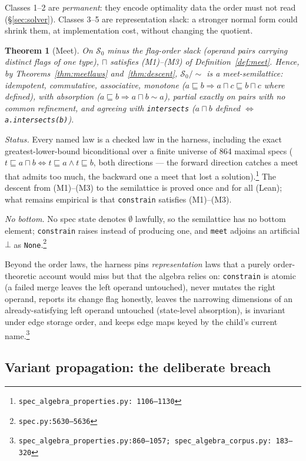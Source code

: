 \documentclass[11pt]{article}
\newtheorem{theorem}{Theorem}[section]
\theoremstyle{definition}
\theoremstyle{remark}
\newcommand{\sat}{\sqsubseteq}
\renewcommand{\ker}{\sim}
\newcommand{\meet}{\sqcap}
\newcommand{\Spec}{\mathcal{S}}
\newcommand{\code}[1]{\texttt{#1}}
\newcommand{\src}[1]{\footnote{\code{#1}}}
\begin{document}
Classes 1--2 are \emph{permanent}: they encode optimality data the order must
not read (\S\ref{sec:solver}).  Classes 3--5 are representation slack: a
stronger normal form could shrink them, at implementation cost, without
changing the quotient.

\begin{theorem}[Meet]\label{thm:constrainmeet}
On $\Spec_0$ minus the flag-order slack (operand pairs carrying distinct
flags of one type), $\meet$ satisfies (M1)--(M3) of
Definition~\ref{def:meet}.  Hence, by Theorems~\ref{thm:meetlaws}
and~\ref{thm:descent}, $\Spec_0/\!\ker$ is a meet-semilattice: idempotent,
commutative, associative, monotone
($a \sat b \Rightarrow a \meet c \sat b \meet c$ where defined), with
absorption ($a \sat b \Rightarrow a \meet b \ker a$), partial exactly on
pairs with no common refinement, and agreeing with \code{intersects}
($a \meet b$ defined $\iff$ \code{a.intersects(b)}).
\end{theorem}

\emph{Status.}  Every named law is a checked law in the harness, including the
exact greatest-lower-bound biconditional over a finite universe of 864
maximal specs ($t \sat a \meet b \iff t \sat a \wedge t \sat b$, both
directions --- the forward direction catches a meet that admits too much, the
backward one a meet that lost a solution).\src{spec\_algebra\_properties.py:%
1106--1130}  The descent from (M1)--(M3) to the semilattice is proved once and
for all (Lean); what remains empirical is that \code{constrain} satisfies
(M1)--(M3).

\emph{No bottom.}  No spec state denotes $\emptyset$ lawfully, so the
semilattice has no bottom element; \code{constrain} raises instead of
producing one, and \code{meet} adjoins an artificial $\bot$ as
\code{None}.\src{spec.py:5630--5636}

Beyond the order laws, the harness pins \emph{representation} laws that a
purely order-theoretic account would miss but that the algebra relies on:
\code{constrain} is atomic (a failed merge leaves the left operand
untouched), never mutates the right operand, reports its change flag
honestly, leaves the narrowing dimensions of an already-satisfying left
operand untouched (state-level absorption), is invariant under edge storage
order, and keeps edge maps keyed by the child's current
name.\src{spec\_algebra\_properties.py:860--1057; spec\_algebra\_corpus.py:%
183--320}

\subsection{Variant propagation: the deliberate breach}\label{sec:propagation}
\end{document}
